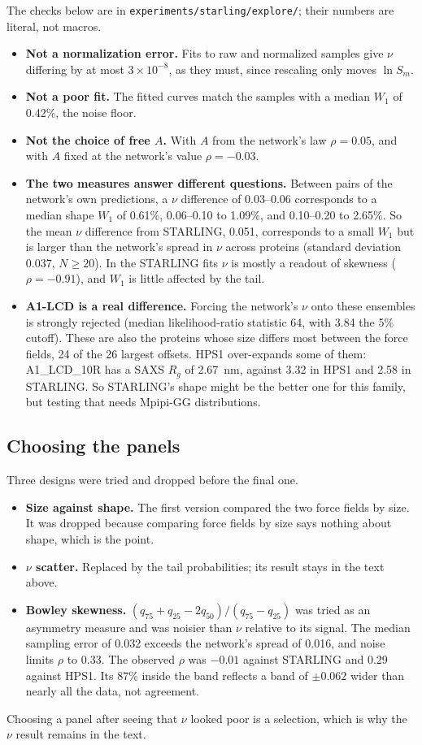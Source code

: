 \documentclass[11pt]{article}
\newcommand{\Rg}{R_g}
\begin{document}
The checks below are in \texttt{experiments/starling/explore/}; their numbers are literal, not macros.
\begin{itemize}
\item \textbf{Not a normalization error.} Fits to raw and normalized samples give $\nu$ differing by at most $3\times10^{-8}$, as they must, since rescaling only moves $\ln S_m$.
\item \textbf{Not a poor fit.} The fitted curves match the samples with a median $W_1$ of 0.42\%, the noise floor.
\item \textbf{Not the choice of free $A$.} With $A$ from the network's law $\rho=0.05$, and with $A$ fixed at the network's value $\rho=-0.03$.
\item \textbf{The two measures answer different questions.} Between pairs of the network's own predictions, a $\nu$ difference of 0.03--0.06 corresponds to a median shape $W_1$ of 0.61\%, 0.06--0.10 to 1.09\%, and 0.10--0.20 to 2.65\%. So the mean $\nu$ difference from STARLING, 0.051, corresponds to a small $W_1$
  but is larger than the network's spread in $\nu$ across proteins (standard deviation 0.037, $N\geq20$). In the STARLING fits $\nu$ is mostly a readout of skewness ($\rho=-0.91$), and $W_1$ is little affected by the tail.
\item \textbf{A1-LCD is a real difference.} Forcing the network's $\nu$ onto these ensembles is strongly rejected (median likelihood-ratio statistic 64, with 3.84 the 5\% cutoff). These are also the proteins whose size differs most between the force fields, 24 of the 26 largest offsets. HPS1 over-expands some of them: A1\_LCD\_10R has a SAXS $\Rg$ of 2.67~nm, against 3.32 in HPS1 and 2.58 in STARLING. So STARLING's shape might be the better one for this family, but testing that needs Mpipi-GG distributions.
\end{itemize}

\subsection{Choosing the panels}
Three designs were tried and dropped before the final one.
\begin{itemize}
\item \textbf{Size against shape.} The first version compared the two force fields by size. It was dropped because comparing force fields by size says nothing about shape, which is the point.
\item \textbf{$\nu$ scatter.} Replaced by the tail probabilities; its result stays in the text above.
\item \textbf{Bowley skewness.} $(q_{75}+q_{25}-2q_{50})/(q_{75}-q_{25})$ was tried as an asymmetry measure and was noisier than $\nu$ relative to its signal. The median sampling error of 0.032 exceeds the network's spread of 0.016, and noise limits $\rho$ to 0.33. The observed $\rho$ was $-0.01$ against STARLING and 0.29 against HPS1. Its 87\% inside the band reflects a band of $\pm0.062$ wider than nearly all the data, not agreement.
\end{itemize}
Choosing a panel after seeing that $\nu$ looked poor is a selection, which is why the $\nu$ result remains in the text.
\end{document}
